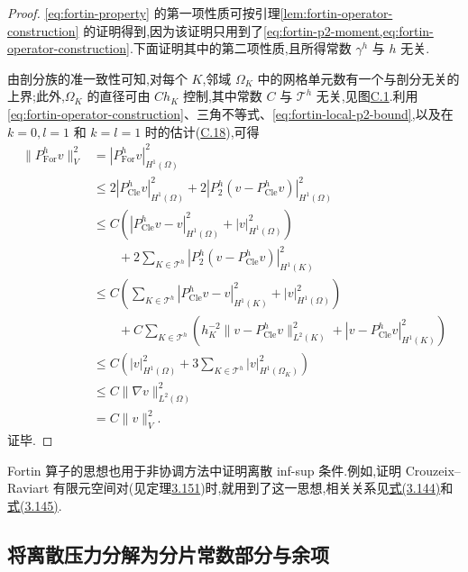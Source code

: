 \begin{proof}
\cref{eq:fortin-property} 的第一项性质可按引理\ref{lem:fortin-operator-construction} 的证明得到,因为该证明只用到了\cref{eq:fortin-p2-moment,eq:fortin-operator-construction}.下面证明其中的第二项性质,且所得常数 $\gamma^h$ 与 $h$ 无关.

由剖分族的准一致性可知,对每个 $K$,邻域 $\Omega_K$ 中的网格单元数有一个与剖分无关的上界;此外,$\Omega_K$ 的直径可由 $Ch_K$ 控制,其中常数 $C$ 与 $\mathcal{T}^h$ 无关,见图\hyperref[fig:appendix-c-1]{C.1}.利用\cref{eq:fortin-operator-construction}、三角不等式、\cref{eq:fortin-local-p2-bound},以及在 $k=0,l=1$ 和 $k=l=1$ 时的估计(\hyperref[eq:appendix-c-18]{C.18}),可得
\[
\begin{aligned}
  \|P_{\mathrm{For}}^h v\|_V^2
  &=|P_{\mathrm{For}}^h v|_{H^1(\Omega)}^2\\
  &\le 2|P_{\mathrm{Cle}}^h v|_{H^1(\Omega)}^2
       +2|P_2^h(v-P_{\mathrm{Cle}}^h v)|_{H^1(\Omega)}^2\\
  &\le C\left(|P_{\mathrm{Cle}}^h v-v|_{H^1(\Omega)}^2
                 +|v|_{H^1(\Omega)}^2\right)\\
  &\qquad+2\sum_{K\in\mathcal{T}^h}
        |P_2^h(v-P_{\mathrm{Cle}}^h v)|_{H^1(K)}^2\\
  &\le C\left(\sum_{K\in\mathcal{T}^h}
          |P_{\mathrm{Cle}}^h v-v|_{H^1(K)}^2
          +|v|_{H^1(\Omega)}^2\right)\\
  &\qquad+C\sum_{K\in\mathcal{T}^h}
       \left(h_K^{-2}\|v-P_{\mathrm{Cle}}^h v\|_{L^2(K)}^2
       +|v-P_{\mathrm{Cle}}^h v|_{H^1(K)}^2\right)\\
  &\le C\left(|v|_{H^1(\Omega)}^2
       +3\sum_{K\in\mathcal{T}^h}|v|_{H^1(\Omega_K)}^2\right)\\
  &\le C\|\nabla v\|_{L^2(\Omega)}^2\\
  &=C\|v\|_V^2.
\end{aligned}
\]
证毕.
\end{proof}

\begin{note}[非协调离散]\label{note:fortin-nonconforming}
Fortin 算子的思想也用于非协调方法中证明离散 inf-sup 条件.例如,证明 Crouzeix--Raviart 有限元空间对(见定理\hyperref[thm:crouzeix-raviart-infsup]{3.151})时,就用到了这一思想,相关关系见\hyperref[eq:crouzeix-raviart-fortin-identity]{式(3.144)}和\hyperref[eq:crouzeix-raviart-fortin-bound]{式(3.145)}.
\end{note}

\subsection{将离散压力分解为分片常数部分与余项}\label{subsec:pressure-splitting}

